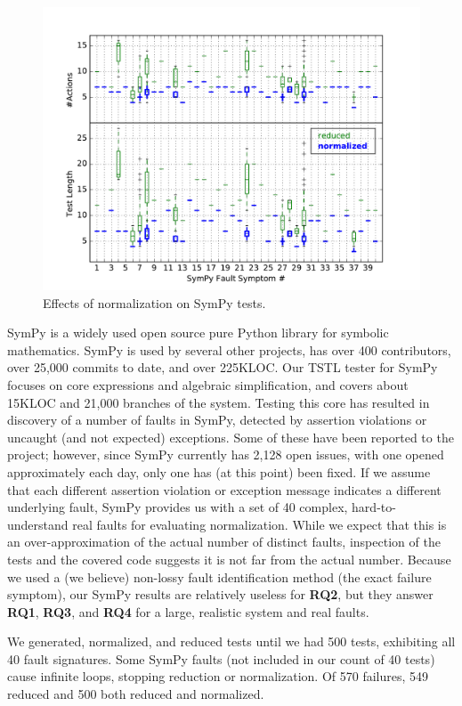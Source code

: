 \begin{figure}
\includegraphics[width=\columnwidth]{sympyd}
\caption{Effects of normalization on SymPy tests.}
\label{lengthandactions}
\end{figure}

SymPy \cite{SymPy} is a widely used open source pure Python library
for symbolic mathematics.  SymPy is used by several other projects,
has over 400 contributors, over 25,000 commits to date, and over
225KLOC.  Our TSTL tester for SymPy focuses on core expressions and
algebraic simplification, and covers about 15KLOC and 21,000 branches of
the system.  Testing this core has resulted in discovery of a number
of faults in SymPy, detected by assertion violations or uncaught (and
not expected) exceptions.  Some of these have been reported to the project;
however, since SymPy currently has 2,128 open issues, with one opened
approximately each day, only one has (at this point) been fixed.  If we assume that
each different assertion violation or exception message indicates a
different underlying fault, SymPy provides us with a set of 40
complex, hard-to-understand real faults for evaluating normalization.
While we expect that this is an over-approximation of the actual
number of distinct faults, inspection of the tests and the covered
code suggests it is not far from the actual number.  Because we used a
(we believe)
non-lossy fault identification method (the exact failure symptom), our
SymPy results are relatively useless for {\bf RQ2}, but they answer {\bf RQ1}, {\bf RQ3}, and {\bf RQ4} for a large, realistic
system and real faults.

We generated, normalized, and reduced tests until we had 500 tests,
exhibiting all 40 fault signatures.    Some SymPy faults (not
included in our count of 40 tests) cause infinite loops, stopping
reduction or normalization. Of 570 failures, 549 reduced
and 500 both reduced and normalized.

